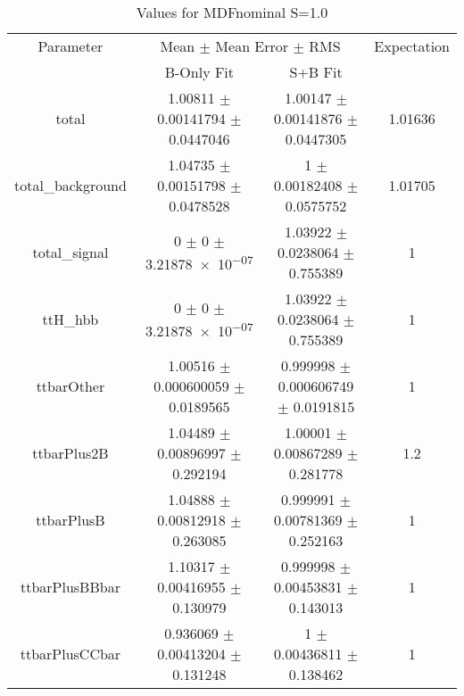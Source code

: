 \begin{table}
\centering
\caption{Values for MDFnominal S=1.0}
\begin{tabular}{cccc}
\toprule
Parameter & \multicolumn{2}{c}{Mean $\pm$ Mean Error $\pm$ RMS} & Expectation\\
 & B-Only Fit & S+B Fit & \\
\midrule
total & \num{1.00811} $\pm$ \num{0.00141794} $\pm$ \num{0.0447046} & \num{1.00147} $\pm$ \num{0.00141876} $\pm$ \num{0.0447305} & \num{1.01636}\\
total\_background & \num{1.04735} $\pm$ \num{0.00151798} $\pm$ \num{0.0478528} & \num{1} $\pm$ \num{0.00182408} $\pm$ \num{0.0575752} & \num{1.01705}\\
total\_signal & \num{0} $\pm$ \num{0} $\pm$ \num{3.21878e-07} & \num{1.03922} $\pm$ \num{0.0238064} $\pm$ \num{0.755389} & \num{1}\\
ttH\_hbb & \num{0} $\pm$ \num{0} $\pm$ \num{3.21878e-07} & \num{1.03922} $\pm$ \num{0.0238064} $\pm$ \num{0.755389} & \num{1}\\
ttbarOther & \num{1.00516} $\pm$ \num{0.000600059} $\pm$ \num{0.0189565} & \num{0.999998} $\pm$ \num{0.000606749} $\pm$ \num{0.0191815} & \num{1}\\
ttbarPlus2B & \num{1.04489} $\pm$ \num{0.00896997} $\pm$ \num{0.292194} & \num{1.00001} $\pm$ \num{0.00867289} $\pm$ \num{0.281778} & \num{1.2}\\
ttbarPlusB & \num{1.04888} $\pm$ \num{0.00812918} $\pm$ \num{0.263085} & \num{0.999991} $\pm$ \num{0.00781369} $\pm$ \num{0.252163} & \num{1}\\
ttbarPlusBBbar & \num{1.10317} $\pm$ \num{0.00416955} $\pm$ \num{0.130979} & \num{0.999998} $\pm$ \num{0.00453831} $\pm$ \num{0.143013} & \num{1}\\
ttbarPlusCCbar & \num{0.936069} $\pm$ \num{0.00413204} $\pm$ \num{0.131248} & \num{1} $\pm$ \num{0.00436811} $\pm$ \num{0.138462} & \num{1}\\
\bottomrule
\end{tabular}
\end{table}